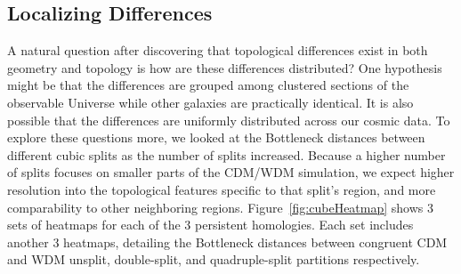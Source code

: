 \documentclass[12pt]{article}
\newcommand{\figref}[1]{Figure~\ref{#1}}
\begin{document}
\subsection{Localizing Differences}
A natural question after discovering that topological differences exist in both geometry and topology is how are these differences distributed? One hypothesis might be that the differences are grouped among clustered sections of the observable Universe while other galaxies are practically identical. It is also possible that the differences are uniformly distributed across our cosmic data. To explore these questions more, we looked at the Bottleneck distances between different cubic splits as the number of splits increased. Because a higher number of splits focuses on smaller parts of the CDM/WDM simulation, we expect higher resolution into the topological features specific to that split's region, and more comparability to other neighboring regions. \figref{fig:cubeHeatmap} shows 3 sets of heatmaps for each of the 3 persistent homologies. Each set includes another 3 heatmaps, detailing the Bottleneck distances between congruent CDM and WDM unsplit, double-split, and quadruple-split partitions respectively.
\end{document}
